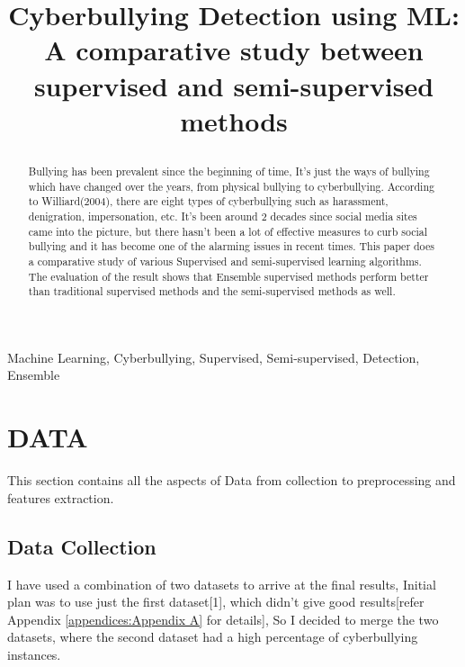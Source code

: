 \documentclass[10pt,conference]{IEEEtran}
\begin{document}
\title{Cyberbullying Detection using ML: A comparative study between supervised and semi-supervised methods

}

\author{

}

\maketitle

\begin{abstract}
Bullying has been prevalent since the beginning of time, It’s just the ways of bullying which have changed over the years, from physical bullying to cyberbullying. According to Williard(2004), there are eight types of cyberbullying such as harassment, denigration, impersonation, etc. It’s been around 2 decades since social media sites came into the picture, but there hasn’t been a lot of effective measures to curb social bullying and it has become one of the alarming issues in recent times.  This paper does a comparative study of various Supervised and semi-supervised learning algorithms. The evaluation of the result shows that Ensemble supervised methods perform better than traditional supervised methods and the semi-supervised methods as well.

\end{abstract}

\begin{IEEEkeywords}
Machine Learning, Cyberbullying, Supervised, Semi-supervised, Detection, Ensemble
\end{IEEEkeywords}

\section{DATA}
This section contains all the aspects of Data from collection to preprocessing and features extraction.

\subsection{Data Collection}

I have used a combination of two datasets to arrive at the final results, Initial plan was to use just the first dataset[1], which didn’t give good results[refer Appendix \ref{appendices:Appendix A} for details], So I decided to merge the two datasets, where the second dataset had a high percentage of cyberbullying instances.
\end{document}
